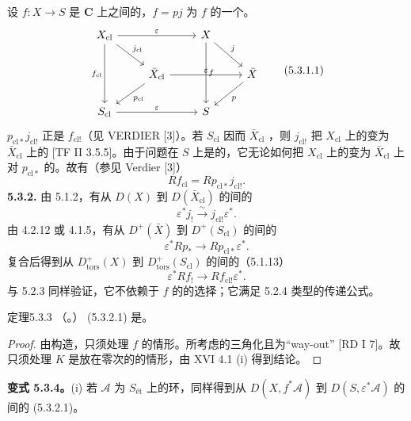 设 $f:X\to S$ 是 $\mathbf C$ 上之间的，$f=pj$ 为 $f$ 的一个。
\[\begin{tikzcd}X_{\mathrm{cl}}\arrow[rr,"\varepsilon"]\arrow[dr,"j_{\mathrm{cl}}"]\arrow[dd,"f_{\mathrm{cl}}"']&&X\arrow[dr,"j"]\arrow[dd,"f"]&\\&\bar X_{\mathrm{cl}}\arrow[rr,"\varepsilon"]\arrow[dl,"p_{\mathrm{cl}}"]&&\bar X\arrow[dl,"p"]\\S_{\mathrm{cl}}\arrow[rr,"\varepsilon"]&&S&\end{tikzcd}\tag{5.3.1.1}\]
 $p_{\mathrm{cl}*}j_{\mathrm{cl}!}$ 正是 $f_{\mathrm{cl}!}$（见 VERDIER [3]）。若 $S_{\mathrm{cl}}$ 因而 $\bar X_{\mathrm{cl}}$ ，则 $j_{\mathrm{cl}!}$ 把 $X_{\mathrm{cl}}$ 上的变为 $\bar X_{\mathrm{cl}}$ 上的 [TF II 3.5.5]。由于问题在 $S$ 上是的，它无论如何把 $X_{\mathrm{cl}}$ 上的变为 $\bar X_{\mathrm{cl}}$ 上对 $p_{\mathrm{cl}*}$ 的。故有（参见 Verdier [3]）
\[Rf_{\mathrm{cl}}=Rp_{\mathrm{cl}*}j_{\mathrm{cl}!}.\]
\textbf{5.3.2.} 由 5.1.2，有从 $D(X)$ 到 $D(\bar X_{\mathrm{cl}})$ 的间的
\[\varepsilon^*j_!\xrightarrow{\sim}j_{\mathrm{cl}!}\varepsilon^*.\]
由 4.2.12 或 4.1.5，有从 $D^+(\bar X)$ 到 $D^+(S_{\mathrm{cl}})$ 的间的
\[\varepsilon^*Rp_*\longrightarrow Rp_{\mathrm{cl}*}\varepsilon^*.\]
复合后得到从 $D^+_{\mathrm{tors}}(X)$ 到 $D^+_{\mathrm{tors}}(S_{\mathrm{cl}})$ 的间的（5.1.13）
\[\varepsilon^*Rf_!\longrightarrow Rf_{\mathrm{cl}!}\varepsilon^*.\tag{5.3.2.1}\]
与 5.2.3 同样验证，它不依赖于 $f$ 的的选择；它满足 5.2.4 类型的传递公式。
\begin{SGAresult}{定理}{5.3.3}
（。） (5.3.2.1) 是。
\end{SGAresult}
\begin{proof}
由构造，只须处理 $f$ 的情形。所考虑的三角化且为“way-out” [RD I 7]。故只须处理 $K$ 是放在零次的的情形，由 XVI 4.1 (i) 得到结论。
\end{proof}
\textbf{变式 5.3.4。}(i) 若 $\mathscr A$ 为 $S_{\text{ét}}$ 上的环，同样得到从 $D(X,f^*\mathscr A)$ 到 $D(S,\varepsilon^*\mathscr A)$ 的间的 (5.3.2.1)。

